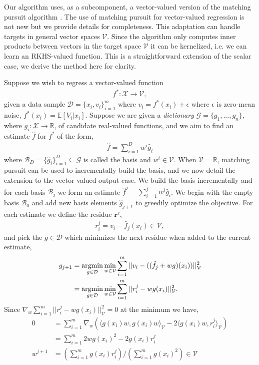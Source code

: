\documentclass[letterpaper]{article}
\newcommand{\MallatMatchingPursuit}{DBLP:journals/tsp/MallatZ93}
\newcommand{\LeverPoliciesInRKHS}{DBLP:conf/aistats/LeverS15}
\newcommand{\cD}{{\mathcal D}}
\newcommand{\cB}{{\mathcal B}}
\newcommand{\cV}{{\mathcal V}}
\newcommand{\cX}{{\mathcal X}}
\newcommand{\cG}{{\mathcal G}}
\newcommand{\br}{{\bm r}}
\newcommand{\E}{{\mathbb E}}
\newcommand{\R}{{\mathbb R}}
\newcommand{\argmin}{\operatornamewithlimits{argmin}}
\newcommand{\lang}{\langle}
\newcommand{\rang}{\rangle}
\newcommand{\nn}{\nonumber}
\begin{document}
Our algorithm uses, as a subcomponent, a vector-valued version of the matching pursuit algorithm \citep{\MallatMatchingPursuit}. The use of matching pursuit for vector-valued regression is not new \citep[see e.g.][]{\LeverPoliciesInRKHS} but we provide details for completeness. This adaptation can handle targets in general vector spaces $\cV$. Since the algorithm only computes inner products between vectors in the target space $\cV$ it can be kernelized, i.e. we can learn an RKHS-valued function. This is a straightforward extension of the scalar case, we derive the method here for clarity.

Suppose we wish to regress a vector-valued function
\begin{align}
f^*:\cX\to\cV, \nn
\end{align}
given a data sample $\cD = \{x_i,v_i\}_{i=1}^m$ where $v_i = f^*(x_i)+\epsilon$ where $\epsilon$ is zero-mean noise, $f^*(x_i) = \E[V_i|x_i]$. Suppose we are given a \emph{dictionary} $\cG = \{g_1,...,g_n\}$, where $g_i:\cX\to\R$, of candidate real-valued functions, and we aim to find an estimate $\hat f$ for $f^*$ of the form,
\begin{align}
\hat f = \sum_{i=1}^D w^i \hat g_i \nn
\end{align}
where $\cB_D = \{ \hat g_i \}_{i=1}^D \subseteq \cG$ is called the basis and $w^i\in\cV$. When $\cV=\R$, matching pursuit \cite{\MallatMatchingPursuit} can be used to incrementally build the basis, and we now detail the extension to the vector-valued output case. We build the basis incrementally and for each basis $\cB_j$ we form an estimate $\hat f^j = \sum_{i=1}^j w^i \hat g_i$. We begin with the empty basis $\cB_0$  and add new basis elements $\hat g_{j+1}$ to greedily optimize the objective. For each estimate we define the residue $\br^j$,
\begin{align}
r^j_i = v_i - \hat f_j(x_i) \in\cV , \nn
\end{align}
and pick the $g\in\cD$ which minimizes the next residue when added to the current estimate,
\begin{align}
g_{j+1} &= \argmin_{g\in\cD}\min_{w \in\cV} \sum_{i=1}^m ||v_i - ( (\hat f_j + w g) (x_i)  )||_{\cV}^2 \nn\\
&=\argmin_{g\in\cD}\min_{w\in\cV} \sum_{i=1}^m ||r^j_i -  w g(x_i)  ||_{\cV}^2. \nn
\end{align}
Since $\nabla_{w}  \sum_{i=1}^m ||r^j_i -  w g(x_i)  ||_\cV^2  = 0$ at the minimum we have,
\begin{align}
0 &= \sum_{i=1}^m  \nabla_w \left(  \lang  g(x_i)w,g(x_i)w  \rang_{\cV} -2\lang g(x_i) w, r^j_i \rang_\cV \right)  \nn\\
&=  \sum_{i=1}^m 2w g(x_i)^2 -2 g(x_i)  r^j_i  \nn\\
w^{j+1} &=  \left(\sum_{i=1}^m  g(x_i)  r^j_i \right) /\left( \sum_{i=1}^m  g(x_i)^2 \right) \in\cV \nn
\end{align}
\end{document}
